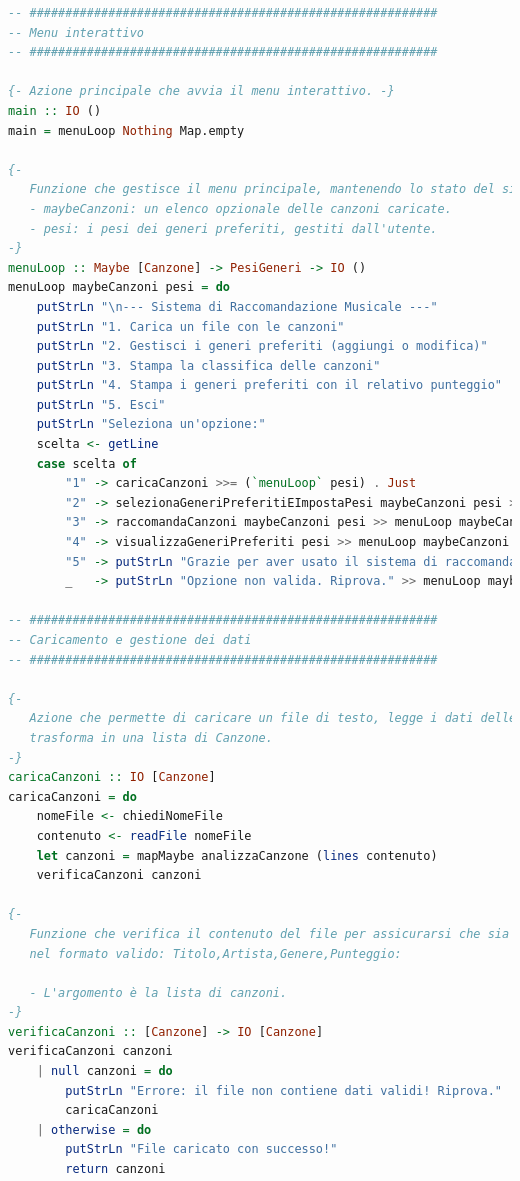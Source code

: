 \documentclass[a4paper,11pt]{article}
\begin{document}
\begin{lstlisting}[language=Haskell]
-- #########################################################
-- Menu interattivo
-- #########################################################

{- Azione principale che avvia il menu interattivo. -}
main :: IO ()
main = menuLoop Nothing Map.empty

{-
   Funzione che gestisce il menu principale, mantenendo lo stato del sistema:
   - maybeCanzoni: un elenco opzionale delle canzoni caricate.
   - pesi: i pesi dei generi preferiti, gestiti dall'utente.
-}
menuLoop :: Maybe [Canzone] -> PesiGeneri -> IO ()
menuLoop maybeCanzoni pesi = do
    putStrLn "\n--- Sistema di Raccomandazione Musicale ---"
    putStrLn "1. Carica un file con le canzoni"
    putStrLn "2. Gestisci i generi preferiti (aggiungi o modifica)"
    putStrLn "3. Stampa la classifica delle canzoni"
    putStrLn "4. Stampa i generi preferiti con il relativo punteggio"
    putStrLn "5. Esci"
    putStrLn "Seleziona un'opzione:"
    scelta <- getLine
    case scelta of
        "1" -> caricaCanzoni >>= (`menuLoop` pesi) . Just
        "2" -> selezionaGeneriPreferitiEImpostaPesi maybeCanzoni pesi >>= menuLoop maybeCanzoni
        "3" -> raccomandaCanzoni maybeCanzoni pesi >> menuLoop maybeCanzoni pesi
        "4" -> visualizzaGeneriPreferiti pesi >> menuLoop maybeCanzoni pesi
        "5" -> putStrLn "Grazie per aver usato il sistema di raccomandazione. Arrivederci!"
        _   -> putStrLn "Opzione non valida. Riprova." >> menuLoop maybeCanzoni pesi

-- #########################################################
-- Caricamento e gestione dei dati
-- #########################################################

{-
   Azione che permette di caricare un file di testo, legge i dati delle canzoni e li
   trasforma in una lista di Canzone.
-}
caricaCanzoni :: IO [Canzone]
caricaCanzoni = do
    nomeFile <- chiediNomeFile
    contenuto <- readFile nomeFile
    let canzoni = mapMaybe analizzaCanzone (lines contenuto)
    verificaCanzoni canzoni

{-
   Funzione che verifica il contenuto del file per assicurarsi che sia
   nel formato valido: Titolo,Artista,Genere,Punteggio:

   - L'argomento è la lista di canzoni.
-}
verificaCanzoni :: [Canzone] -> IO [Canzone]
verificaCanzoni canzoni
    | null canzoni = do
        putStrLn "Errore: il file non contiene dati validi! Riprova."
        caricaCanzoni
    | otherwise = do
        putStrLn "File caricato con successo!"
        return canzoni


\end{lstlisting}
\end{document}
